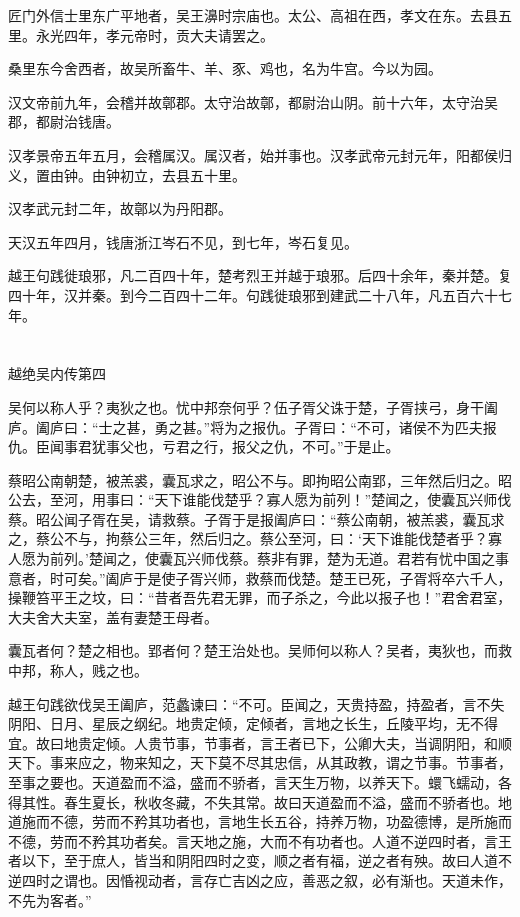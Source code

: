 \documentclass[12pt,UTF8]{ctexbook}
\begin{document}
匠门外信士里东广平地者，吴王濞时宗庙也。太公、高祖在西，孝文在东。去县五里。永光四年，孝元帝时，贡大夫请罢之。

桑里东今舍西者，故吴所畜牛、羊、豕、鸡也，名为牛宫。今以为园。

汉文帝前九年，会稽并故鄣郡。太守治故鄣，都尉治山阴。前十六年，太守治吴郡，都尉治钱唐。

汉孝景帝五年五月，会稽属汉。属汉者，始并事也。汉孝武帝元封元年，阳都侯归义，置由钟。由钟初立，去县五十里。

汉孝武元封二年，故鄣以为丹阳郡。

天汉五年四月，钱唐浙江岑石不见，到七年，岑石复见。

越王句践徙琅邪，凡二百四十年，楚考烈王并越于琅邪。后四十余年，秦并楚。复四十年，汉并秦。到今二百四十二年。句践徙琅邪到建武二十八年，凡五百六十七年。

\part{}

越绝吴内传第四

吴何以称人乎？夷狄之也。忧中邦奈何乎？伍子胥父诛于楚，子胥挟弓，身干阖庐。阖庐曰：“士之甚，勇之甚。”将为之报仇。子胥曰：“不可，诸侯不为匹夫报仇。臣闻事君犹事父也，亏君之行，报父之仇，不可。”于是止。

蔡昭公南朝楚，被羔裘，囊瓦求之，昭公不与。即拘昭公南郢，三年然后归之。昭公去，至河，用事曰：“天下谁能伐楚乎？寡人愿为前列！”楚闻之，使囊瓦兴师伐蔡。昭公闻子胥在吴，请救蔡。子胥于是报阖庐曰：“蔡公南朝，被羔裘，囊瓦求之，蔡公不与，拘蔡公三年，然后归之。蔡公至河，曰：‘天下谁能伐楚者乎？寡人愿为前列。’楚闻之，使囊瓦兴师伐蔡。蔡非有罪，楚为无道。君若有忧中国之事意者，时可矣。”阖庐于是使子胥兴师，救蔡而伐楚。楚王已死，子胥将卒六千人，操鞭笞平王之坟，曰：“昔者吾先君无罪，而子杀之，今此以报子也！”君舍君室，大夫舍大夫室，盖有妻楚王母者。

囊瓦者何？楚之相也。郢者何？楚王治处也。吴师何以称人？吴者，夷狄也，而救中邦，称人，贱之也。

越王句践欲伐吴王阖庐，范蠡谏曰：“不可。臣闻之，天贵持盈，持盈者，言不失阴阳、日月、星辰之纲纪。地贵定倾，定倾者，言地之长生，丘陵平均，无不得宜。故曰地贵定倾。人贵节事，节事者，言王者已下，公卿大夫，当调阴阳，和顺天下。事来应之，物来知之，天下莫不尽其忠信，从其政教，谓之节事。节事者，至事之要也。天道盈而不溢，盛而不骄者，言天生万物，以养天下。蠉飞蠕动，各得其性。春生夏长，秋收冬藏，不失其常。故曰天道盈而不溢，盛而不骄者也。地道施而不德，劳而不矜其功者也，言地生长五谷，持养万物，功盈德博，是所施而不德，劳而不矜其功者矣。言天地之施，大而不有功者也。人道不逆四时者，言王者以下，至于庶人，皆当和阴阳四时之变，顺之者有福，逆之者有殃。故曰人道不逆四时之谓也。因惛视动者，言存亡吉凶之应，善恶之叙，必有渐也。天道未作，不先为客者。”
\end{document}

